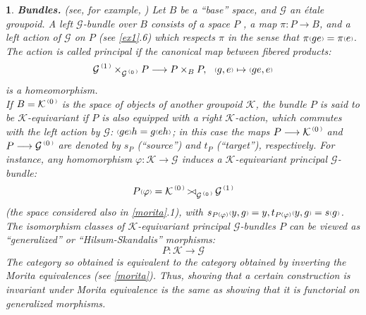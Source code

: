 \documentclass[a4paper]{article}
\newtheorem{num}[st]{}
\newcommand{\f}{\ensuremath{\varphi}}
\newcommand{\rmap}{\longrightarrow}
\newcommand{\Ka}{\ensuremath{\mathcal{K}}}
\newcommand{\G}{\ensuremath{\mathcal{G}}}
\newcommand{\ps}{{\raise 1pt\hbox{\tiny (}}}
\newcommand{\pd}{{\raise 1pt\hbox{\tiny )}}}
\newcommand{\nG}[1]{\ensuremath{\G^{\,\ps #1\,\pd}}}
\newcommand{\nK}[1]{\ensuremath{\Ka^{\,\ps #1\,\pd}}}
\def\cross{\mathinner{\mathrel{\raise0.8pt\hbox{$\scriptstyle>$}}
                 \joinrel\mathrel\triangleleft}}
\begin{document}
\begin{num}
\label{bundles}
\emph{
{\bf Bundles.} (see, for example, \cite{Bo, Ha1, HiSk, Fourier, Mr, Mrr}) Let $B$ be a ``base'' space, and $\G$ an \'etale groupoid. A left $\G$-bundle over $B$ consists of a space $P$ , a map $\pi : P \rmap B$, and a left action of $\G$ on $P$ (see \ref{ex1}.6) which respects $\pi$ in the sense that $\pi \ps ge\pd= \pi\ps e\pd$. The action is called principal if the canonical map between fibered products:
\[ \nG{1}\times_{\nG{0}} P \rmap P\times_{B} P , \ \ \ps g, e\pd \mapsto \ps ge, e\pd \]
is a homeomorphism. \\
\hspace*{.3in} If $B= \nK{0}$ is the space of objects of another groupoid $\Ka$, the bundle $P$ is said to be $\Ka$-equivariant if $P$ is also equipped with a right $\Ka$-action, which commutes with the left action by $\G$: $\ps g e\pd  h= g \ps e h\pd$; in this case the maps $P \rmap \nK{0}$ and $P \rmap \nG{0}$ are denoted by $s_{P}$ (``source'') and $t_{P}$ (``target''), respectively. For instance, any homomorphism $\f :\Ka \rmap\G$ induces a $\Ka$-equivariant principal $\G$-bundle:
\[ P\ps\f \pd = \nK{0}\cross_{\nG{0}}\nG{1} \]
(the space considered also in \ref{morita}.1), with $s_{P\ps\f \pd}\ps y, g\pd = y, t_{P\ps\f \pd}\ps y, g\pd = s\ps g\pd$.
The isomorphism classes of $\Ka$-equivariant principal $\G$-bundles $P$ can be viewed as ``generalized'' or ``Hilsum-Skandalis'' morphisms:
\[ P: \Ka \rmap \G \]
\hspace*{.3in} The category so obtained is equivalent to the category obtained by inverting the Morita equivalences (see \ref{morita}). Thus, showing that a certain construction is invariant under Morita equivalence is the same as showing that it is functorial on generalized morphisms.
}
\end{num}
\end{document}
